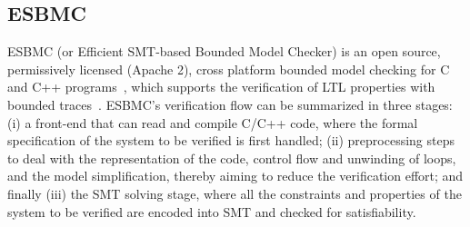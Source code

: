 \documentclass[journal]{IEEEtran}
\begin{document}
\subsection{ESBMC}
ESBMC (or Efficient SMT-based Bounded Model Checker) is an open source, permissively licensed (Apache 2), cross platform bounded model checking for C and C++ programs~\cite{esbmc2018}, which supports the verification of LTL properties with bounded traces~\cite{DBLP:journals/sosym/MorseCN015}. 
%
ESBMC's verification flow can be summarized in three stages: (i) a front-end that can read and compile C/C++ code, where the formal specification of the system to be verified is first handled; (ii) preprocessing steps to deal with the representation of the code, control flow and unwinding of loops, and the model simplification, thereby aiming to reduce the verification effort; and finally (iii) the SMT solving stage, where all the constraints and properties of the system to be verified are encoded into SMT and checked for satisfiability.
%
%
%
\end{document}
